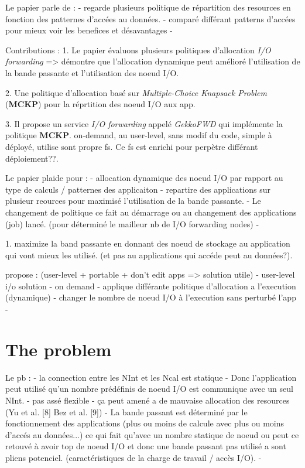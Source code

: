 \documentclass[10pt, a4paper]{article}
\begin{document}

Le papier parle de :
- regarde plusieurs politique de répartition des resources en fonction des patternes d'accées au données.
- comparé différant patterns d'accées pour mieux voir les benefices et désavantages
- 

Contributions :
1. Le papier évaluons plusieurs politiques d'allocation \emph{I/O forwarding} => démontre que l'allocation dynamique peut amélioré l'utilisation de la bande passante et l'utilisation des noeud I/O.

2. Une politique d'allocation basé sur \emph{Multiple-Choice Knapsack Problem} (\textbf{MCKP}) pour la réprtition des noeud I/O aux app.

3. Il propose un service \emph{I/O forwarding} appelé \emph{GekkoFWD} qui implémente la politique \textbf{MCKP}. on-demand, au user-level, sans modif du code, simple à déployé, utilise sont propre fs.
Ce fs est enrichi pour perpètre différant déploiement??.

Le papier plaide pour :
- allocation dynamique des noeud I/O par rapport au type de calculs / patternes des applicaiton
- repartire des applications sur plusieur reources pour maximisé l'utilisation de la bande passante.
- Le changement de politique ce fait au démarrage ou au changement des applications (job) lancé. (pour déterminé le mailleur nb de I/O forwarding nodes)
- 

1. maximize la band passante en donnant des noeud de stockage au application qui vont mieux les utilisé. (et pas au applications qui accéde peut au données?).

propose : (user-level + portable + don't edit apps => solution utile)
- user-level i/o solution
- on demand
- applique différante politique d'allocation a l'execution (dynamique)
- changer le nombre de noeud I/O à l'execution sans perturbé l'app
-

\section{The problem}


Le pb :
- la connection entre les NInt et les Ncal est statique
- Donc l'application peut utilisé qu'un nombre prédéfinis de noeud I/O est communique avec un seul NInt.
- pas assé flexible
- ça peut amené a de mauvaise allocation des resources (Yu et al. [8] Bez et al. [9])
- La bande passant est déterminé par le fonctionnement des applications (plus ou moins de calcule avec plus ou moins d'accés au données...) ce qui fait qu'avec un nombre statique de noeud ou peut ce retouvé à avoir top de noeud I/O et donc une bande passant pas utilisé a sont pliens potenciel. (caractéristiques de la charge de travail / accès I/O).
- 
\end{document}
